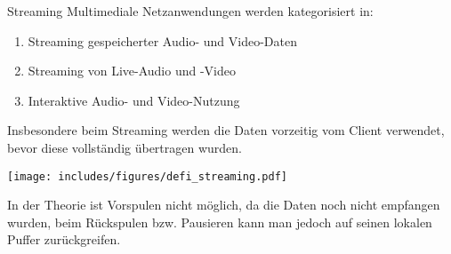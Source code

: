 \begin{defi}{Streaming}
    Multimediale Netzanwendungen werden kategorisiert in:
    \begin{enumerate}
        \item Streaming gespeicherter Audio- und Video-Daten
        \item Streaming von Live-Audio und -Video
        \item Interaktive Audio- und Video-Nutzung
    \end{enumerate}

    Insbesondere beim Streaming werden die Daten vorzeitig vom Client verwendet, bevor diese vollständig übertragen wurden.
    \begin{center}
        \texttt{[image: includes/figures/defi\_streaming.pdf]}
    \end{center}

    In der Theorie ist Vorspulen nicht möglich, da die Daten noch nicht empfangen wurden, beim Rückspulen bzw. Pausieren kann man jedoch auf seinen lokalen Puffer zurückgreifen.
\end{defi}